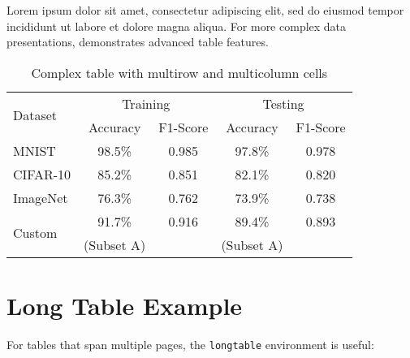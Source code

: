 Lorem ipsum dolor sit amet, consectetur adipiscing elit, sed do eiusmod tempor incididunt ut labore et dolore magna aliqua. For more complex data presentations,  demonstrates advanced table features.

\begin{table}[htbp]
\centering
\caption{Complex table with multirow and multicolumn cells}
\label{tab:complex}
\begin{tabular}{@{}lcccc@{}}
\toprule
\multirow{2}{*}{Dataset} & \multicolumn{2}{c}{Training} & \multicolumn{2}{c}{Testing} \\
\cmidrule(lr){2-3} \cmidrule(lr){4-5}
& Accuracy & F1-Score & Accuracy & F1-Score \\
\midrule
MNIST & 98.5\% & 0.985 & 97.8\% & 0.978 \\
CIFAR-10 & 85.2\% & 0.851 & 82.1\% & 0.820 \\
ImageNet & 76.3\% & 0.762 & 73.9\% & 0.738 \\
\multirow{2}{*}{Custom} & 91.7\% & 0.916 & 89.4\% & 0.893 \\
& (Subset A) & & (Subset A) & \\
\bottomrule
\end{tabular}
\end{table}

\section{Long Table Example}

For tables that span multiple pages, the \texttt{longtable} environment is useful:


